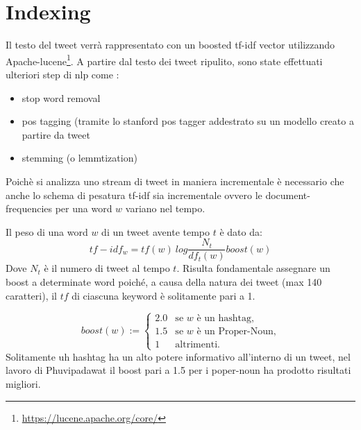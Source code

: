 \documentclass[a4paper,12pt]{report}
\begin{document}
\section{Indexing} 
Il testo del tweet verrà rappresentato con un boosted tf-idf vector utilizzando Apache-lucene\footnote{\href{https://lucene.apache.org/core/}{https://lucene.apache.org/core/}}. 
A partire dal testo dei tweet ripulito, sono state effettuati ulteriori step di nlp come :
\begin{itemize}
\item stop word removal
\item pos tagging (tramite lo stanford pos tagger addestrato su un modello  creato a partire da tweet
\item stemming (o lemmtization)
\end{itemize}
Poich\`e si analizza uno stream di tweet in maniera incrementale è necessario che anche lo schema di pesatura tf-idf sia incrementale ovvero le document-frequencies per una word $w$ variano nel tempo. 

Il peso di una word $w$ di un tweet avente tempo $t$ è dato da:
\begin{equation}
tf-idf_w=tf(w)\ log\frac{N_t}{df_t(w)}boost(w)
\end{equation}
Dove $N_t$ è il numero di tweet al tempo $t$.
Risulta fondamentale assegnare un boost a determinate word poiché, a causa della natura dei tweet (max 140 caratteri), il $tf$ di ciascuna keyword è solitamente pari a 1.  


\begin{equation*}
boost(w):=\begin{cases}
2.0 & \text{se $w$ è un hashtag,}\\
1.5 & \text{se $w$ è un Proper-Noun,}\\
1& \text{altrimenti.}
\end{cases}
\end{equation*}
Solitamente uh hashtag ha un alto potere informativo all’interno di un tweet, nel lavoro di  Phuvipadawat \cite{Phuvipadawat:2010:BND:1913791.1913911}  il boost pari a 1.5  per i poper-noun ha prodotto risultati migliori.

\newpage
\end{document}
